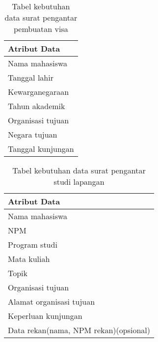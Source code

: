 \begin{table}[h]
\centering
\caption{Tabel kebutuhan data surat pengantar pembuatan visa}
\label{surat_pengantar_pembuatan_visa}
\begin{tabular}{|l|}
\hline
\textbf{Atribut Data}                     \\ \hline
Nama mahasiswa                            \\ \hline 
Tanggal lahir                    			\\ \hline 
Kewarganegaraan                     	    \\ \hline 
Tahun akademik              				\\ \hline 
Organisasi tujuan         			    \\ \hline 
Negara tujuan              			    \\ \hline 
Tanggal kunjungan                         \\ \hline 
\end{tabular}
\end{table}

\begin{table}[h]
\centering
\caption{Tabel kebutuhan data surat pengantar studi lapangan}
\label{surat_keterangan_beasiswa}
\begin{tabular}{|l|}
\hline
\textbf{Atribut Data}                     \\ \hline
Nama mahasiswa                            \\ \hline 
NPM                                      \\ \hline 
Program studi                             \\ \hline
Mata kuliah			                    \\ \hline
Topik        			                    \\ \hline
Organisasi tujuan                         \\ \hline
Alamat organisasi tujuan                  \\ \hline
Keperluan kunjungan                       \\ \hline
Data rekan(nama, NPM rekan)(opsional)     \\ \hline

\end{tabular}
\end{table}

